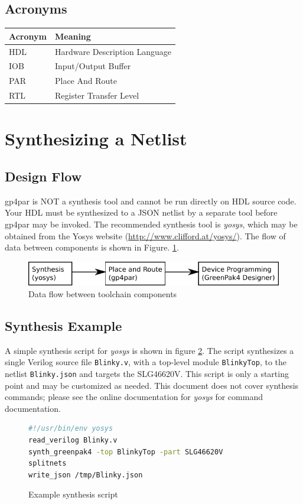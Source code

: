 \documentclass{article}
\begin{document}
\subsection{Acronyms}

\begin{tabularx}{4in}{|l|X|}
\hline
{\bfseries Acronym} & {\bfseries Meaning} \\
\hline
HDL & Hardware Description Language \\
\hline
IOB & Input/Output Buffer \\
\hline
PAR & Place And Route \\
\hline
RTL & Register Transfer Level \\
\hline
\end{tabularx}

\pagebreak
\section{Synthesizing a Netlist}

\subsection{Design Flow}

gp4par is NOT a synthesis tool and cannot be run directly on HDL source code. Your HDL must be synthesized to
a JSON netlist by a separate tool before gp4par may be invoked. The recommended synthesis tool is 
\emph{yosys}, which may be obtained from the Yosys website (\url{http://www.clifford.at/yosys/}). The flow of data 
between components is shown in Figure. \ref{flow}.

\begin{figure}[h]
\centering
\includegraphics[scale=1]{figures/flow.pdf}
\caption{Data flow between toolchain components}
\label{flow}
\end{figure}

\subsection{Synthesis Example}

A simple synthesis script for \emph{yosys} is shown in figure \ref{yscript}. The script synthesizes a single Verilog 
source file \texttt{Blinky.v}, with a top-level module \texttt{BlinkyTop}, to the netlist \texttt{Blinky.json} and 
targets the SLG46620V. This script is only a starting point and may be customized as needed. This document does not
cover synthesis commands; please see the online documentation for \emph{yosys} for command documentation.
\begin{figure}[h]
\begin{lstlisting}[language=sh]
#!/usr/bin/env yosys
read_verilog Blinky.v
synth_greenpak4 -top BlinkyTop -part SLG46620V
splitnets
write_json /tmp/Blinky.json
\end{lstlisting}
\caption{Example synthesis script}
\label{yscript}
\end{figure}
\end{document}
